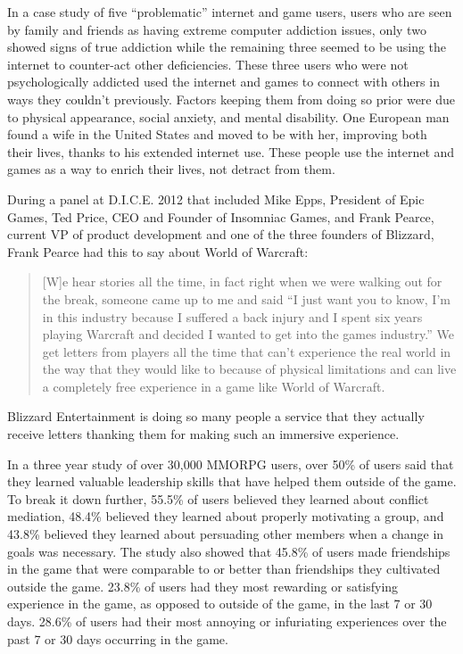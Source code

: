 \documentclass[11pt]{article}
\begin{document}
\begin{multicols}{2}
In a case study of five ``problematic'' internet and game users, users who are seen by family and friends as having extreme computer addiction issues, only two showed signs of true addiction while the remaining three seemed to be using the internet to counter-act other deficiencies. \cite{IsThereEvidenceOfInternetAddiction} These three users who were not psychologically addicted used the internet and games to connect with others in ways they couldn't previously. Factors keeping them from doing so prior were due to physical appearance, social anxiety, and mental disability. One European man found a wife in the United States and moved to be with her, improving both their lives, thanks to his extended internet use. \cite{IsThereEvidenceOfInternetAddiction} These people use the internet and games as a way to enrich their lives, not detract from them.

During a panel at D.I.C.E. 2012 \cite{DICEInterview} that included Mike Epps, President of Epic Games, Ted Price, CEO and Founder of Insomniac Games, and Frank Pearce, current VP of product development and one of the three founders of Blizzard, Frank Pearce had this to say about World of Warcraft:
\begin{quote}
[W]e hear stories all the time, in fact right when we were walking out for the break, someone came up to me and said ``I just want you to know, I'm in this industry because I suffered a back injury and I spent six years playing Warcraft and decided I wanted to get into the games industry.'' We get letters from players all the time that can't experience the real world in the way that they would like to because of physical limitations and can live a completely free experience in a game like World of Warcraft.
\end{quote}
Blizzard Entertainment is doing so many people a service that they actually receive letters thanking them for making such an immersive experience.

In a three year study of over 30,000 MMORPG users, over 50\% of users said that they learned valuable leadership skills that have helped them outside of the game. \cite{MotivationsAndDerviedExperiences} To break it down further, 55.5\% of users believed they learned about conflict mediation, 48.4\% believed they learned about properly motivating a group, and 43.8\% believed they learned about persuading other members when a change in goals was necessary. \cite{MotivationsAndDerviedExperiences}
The study also showed that 45.8\% of users made friendships in the game that were comparable to or better than friendships they cultivated outside the game. 23.8\% of users had they most rewarding or satisfying experience in the game, as opposed to outside of the game, in the last 7 or 30 days. 28.6\% of users had their most annoying or infuriating experiences over the past 7 or 30 days occurring in the game. \cite{MotivationsAndDerviedExperiences}


\end{multicols}
\end{document}
